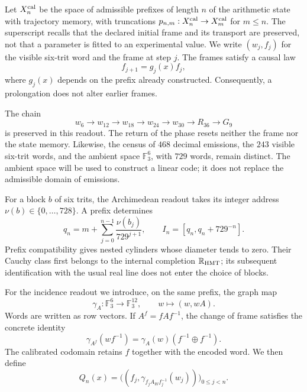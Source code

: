 Let $X_n^{\rm cal}$ be the space of admissible prefixes of length $n$ of the
arithmetic state with trajectory memory, with truncations
$p_{n,m}:X_n^{\rm cal}\to X_m^{\rm cal}$ for $m\leq n$. The superscript
recalls that the declared initial frame and its transport are preserved, not
that a parameter is fitted to an experimental value. We write
$(w_j,f_j)$ for the visible six-trit word and the frame at step
$j$. The frames satisfy a causal law
\[
 f_{j+1}=g_j(x)f_j,
\]
where $g_j(x)$ depends on the prefix already constructed. Consequently, a
prolongation does not alter earlier frames.

The chain
\[
 w_6\longrightarrow w_{12}\longrightarrow w_{18}
 \longrightarrow w_{24}\longrightarrow w_{30}
 \longrightarrow R_{36}\longrightarrow G_9
\]
is preserved in this readout. The return of the phase resets neither the
frame nor the state memory. Likewise, the
census of $468$ decimal emissions, the $243$ visible six-trit words,
and the ambient space $\mathbb F_3^6$, with $729$ words, remain distinct. The ambient space
will be used to construct a linear code; it does not replace the
admissible domain of emissions.

For a block $b$ of six trits, the Archimedean readout takes its
integer address $\nu(b)\in\{0,\ldots,728\}$. A prefix determines
\[
 q_n=m+\sum_{j=0}^{n-1}\frac{\nu(b_j)}{729^{j+1}},
 \qquad I_n=[q_n,q_n+729^{-n}].
\]
Prefix compatibility gives nested cylinders whose diameter tends
to zero. Their Cauchy class first belongs to the internal completion
$\mathbb R_{\rm HMT}$; its subsequent identification with the usual
real line does not enter the choice of blocks.

For the incidence readout we introduce, on the same prefix, the
graph map
\begin{equation}
 \gamma_A:\mathbb F_3^6\longrightarrow\mathbb F_3^{12},
 \qquad w\longmapsto(w,wA).
 \label{exc:gamma}
\end{equation}
Words are written as row vectors. If $A^f=fAf^{-1}$, the
change of frame satisfies the concrete identity
\begin{equation}
 \gamma_{A^f}(wf^{-1})
   =\gamma_A(w)(f^{-1}\oplus f^{-1}).
 \label{exc:covariancia}
\end{equation}
The calibrated codomain retains $f$ together with the encoded word.
We then define
\begin{equation}
 Q_n(x)=\bigl((f_j,\gamma_{f_jA_Wf_j^{-1}}(w_j))\bigr)_{0\leq j<n}.
 \label{exc:qn}
\end{equation}

